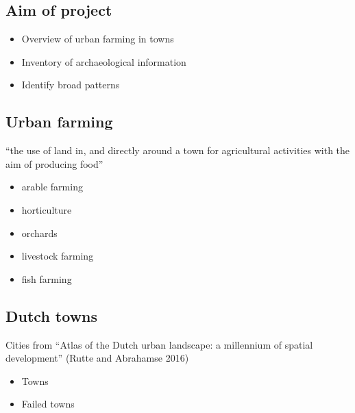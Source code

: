 \documentclass[
  letterpaper,
  DIV=11,
  numbers=noendperiod]{scrartcl}
\providecommand{\tightlist}{%
  \setlength{\itemsep}{0pt}\setlength{\parskip}{0pt}}\usepackage{longtable,booktabs,array}
\begin{document}
\hypertarget{aim-of-project}{%
\subsection{Aim of project}\label{aim-of-project}}

\begin{itemize}
\tightlist
\item
  Overview of urban farming in towns
\item
  Inventory of archaeological information
\item
  Identify broad patterns
\end{itemize}

\hypertarget{urban-farming}{%
\subsection{Urban farming}\label{urban-farming}}

``the use of land in, and directly around a town for agricultural
activities with the aim of producing food''

\begin{itemize}
\tightlist
\item
  arable farming
\item
  horticulture
\item
  orchards
\item
  livestock farming
\item
  fish farming
\end{itemize}

\hypertarget{dutch-towns}{%
\subsection{Dutch towns}\label{dutch-towns}}

Cities from ``Atlas of the Dutch urban landscape: a millennium of
spatial development'' (Rutte and Abrahamse 2016)

\begin{itemize}
\tightlist
\item
  Towns
\item
  Failed towns
\end{itemize}
\end{document}
